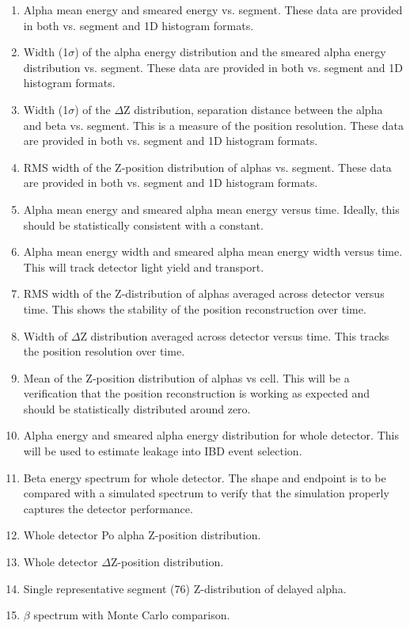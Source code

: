 \begin{enumerate}
\item{Alpha mean energy and smeared energy vs. segment. These data are provided in both vs. segment and 1D histogram formats.}
\item{Width (1$\sigma$) of the alpha energy distribution and the smeared alpha energy distribution vs. segment. These data are provided in both vs. segment and 1D histogram formats.}
\item{Width (1$\sigma$) of the $\Delta$Z distribution, separation distance between the alpha and beta vs. segment. This is a measure of the position resolution. These data are provided in both vs. segment and 1D histogram formats.}
\item{RMS width of the Z-position distribution of alphas vs. segment. These data are provided in both vs. segment and 1D histogram formats.}
\item{Alpha mean energy and smeared alpha mean energy versus time. Ideally, this should be statistically consistent with a constant.}
\item{Alpha mean energy width and smeared alpha mean energy width versus time. This will track detector light yield and transport.}
\item{RMS width of the Z-distribution of alphas averaged across detector versus time. This shows the stability of the position reconstruction over time.}
\item{Width of $\Delta$Z distribution averaged across detector versus time. This tracks the position resolution over time.}
\item{Mean of the Z-position distribution of alphas vs cell. This will be a verification that the position reconstruction is working as expected and should be statistically distributed around zero.}
\item{Alpha energy and smeared alpha energy distribution for whole detector. This will be used to estimate leakage into IBD event selection.}
\item{Beta energy spectrum for whole detector. The shape and endpoint is to be compared with a simulated spectrum to verify that the simulation properly captures the detector performance. }
\item{Whole detector Po alpha Z-position distribution.}
\item{Whole detector $\Delta$Z-position distribution.}
\item {Single representative segment (76) Z-distribution of delayed alpha.}
\item {$\beta$ spectrum with Monte Carlo comparison.}
\end{enumerate}
